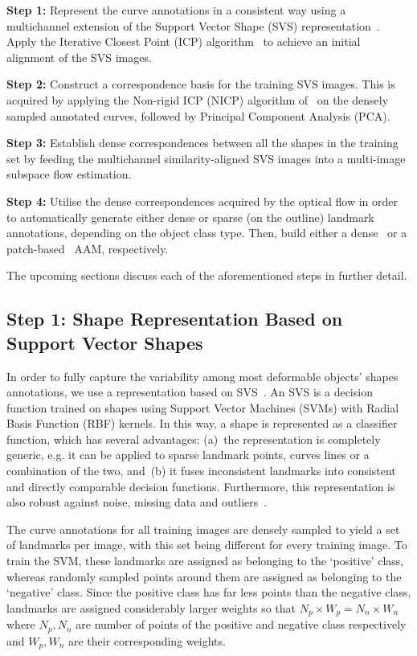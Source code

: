 \noindent\textbf{Step 1:} Represent the curve annotations in a consistent way using a multichannel extension of the Support Vector Shape (SVS) representation~\cite{Nguyen2013}. Apply the Iterative Closest Point (ICP) algorithm~\cite{Besl1992} to achieve an initial alignment of the SVS images.

\noindent\textbf{Step 2:} Construct a correspondence basis for the training SVS images. This is acquired by applying the Non-rigid ICP (NICP) algorithm of~\cite{Amber2007} on the densely sampled annotated curves, followed by Principal Component Analysis (PCA).

\noindent\textbf{Step 3:} Establish dense correspondences between all the shapes in the training set by feeding the multichannel similarity-aligned SVS images into a multi-image subspace flow estimation.

\noindent\textbf{Step 4:} Utilise the dense correspondences acquired by the optical flow in order to automatically generate either dense or sparse (on the outline) landmark annotations, depending on the object class type. Then, build either a dense~\cite{ramnath2008increasing, Amberg2009, anderson2014using} or a patch-based~\cite{Tzimiropoulos2014} AAM, respectively.

The upcoming sections discuss each of the aforementioned steps in further detail.

\subsection*{Step 1: Shape Representation Based on Support Vector Shapes}
\label{sec:step1}

In order to fully capture the variability among most deformable objects' shapes annotations, we use a representation based on SVS~\cite{Nguyen2013}. An SVS is a decision function trained on shapes using Support Vector Machines (SVMs) with Radial Basis Function (RBF) kernels. In this way, a shape is represented as a classifier function, which has several advantages: (a)~the representation is completely generic, e.g. it can be applied to sparse landmark points, curves lines or a combination of the two, and~(b) it fuses inconsistent landmarks into consistent and directly comparable decision functions. Furthermore, this representation is also robust against noise, missing data and outliers~\cite{Nguyen2013}.

The curve annotations for all training images are densely sampled to yield a set of landmarks per image, with this set being different for every training image. To train the SVM, these landmarks are assigned as belonging to the `positive' class, whereas randomly sampled points around them are assigned as belonging to the `negative' class. Since the positive class has far less points than the negative class, landmarks are assigned considerably larger weights so that $N_p \times W_p=N_n \times W_n$ where $N_p, N_n$ are number of points of the positive and negative class respectively and $W_p, W_n$ are their corresponding weights.

